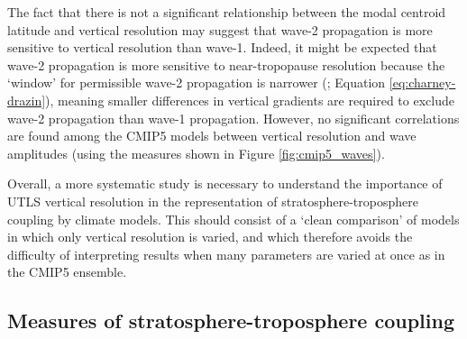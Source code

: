 
The fact that there is not a significant relationship between the modal centroid
latitude and vertical resolution may suggest that wave-2 propagation is
more sensitive to vertical resolution than wave-1. Indeed, it might be
expected that wave-2 propagation is more sensitive to near-tropopause resolution
because the `window' for permissible wave-2 propagation is narrower
(\citet{Charney1961}; Equation \ref{eq:charney-drazin}), meaning smaller
differences in vertical gradients are required to exclude wave-2
propagation than wave-1 propagation. However, no significant correlations
are found among the CMIP5 models between vertical resolution and wave amplitudes
(using the measures shown in Figure \ref{fig:cmip5_waves}).

Overall, a more systematic study is necessary to understand the importance of
UTLS vertical resolution in the representation of stratosphere-troposphere
coupling by climate models. This should consist of a `clean comparison' of
models in which only vertical resolution is varied, and which therefore avoids
the difficulty of interpreting results when many parameters are varied at once
as in the CMIP5 ensemble.




\subsection{Measures of stratosphere-troposphere coupling}
\label{sec:meas-strat-trop}

